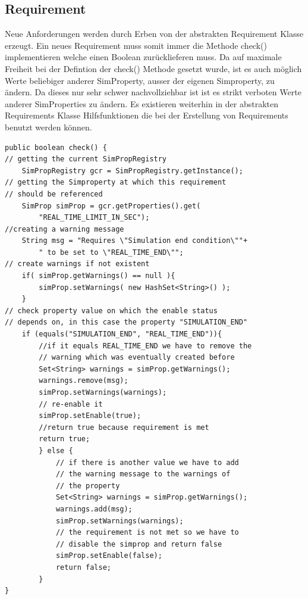 \documentclass[a4paper, 11pt]{article} %
\begin{document}
\subsection{Requirement}
\label{ssub:Requirements}
Neue Anforderungen werden durch Erben von der abstrakten Requirement Klasse erzeugt. Ein neues Requirement muss somit immer die Methode check() implementieren welche einen Boolean zurücklieferen muss. Da auf maximale Freiheit bei der Defintion der check() Methode gesetzt wurde, ist es auch möglich Werte beliebiger anderer SimProperty, ausser der eigenen Simproperty, zu ändern. Da dieses nur sehr schwer nachvollziehbar ist ist es strikt verboten Werte anderer SimProperties zu ändern.
Es existieren weiterhin in der abstrakten Requirements Klasse Hilfsfunktionen die bei der Erstellung von Requirements benutzt werden können.


\begin{lstlisting}[caption={Beispiel: check() Methode einer Enable Anforderung}]
public boolean check() {
// getting the current SimPropRegistry
	SimPropRegistry gcr = SimPropRegistry.getInstance();
// getting the Simproperty at which this requirement 
// should be referenced
	SimProp simProp = gcr.getProperties().get(
		"REAL_TIME_LIMIT_IN_SEC");
//creating a warning message
	String msg = "Requires \"Simulation end condition\""+
	 	" to be set to \"REAL_TIME_END\"";
// create warnings if not existent
	if( simProp.getWarnings() == null ){
		simProp.setWarnings( new HashSet<String>() );
	}
// check property value on which the enable status 
// depends on, in this case the property "SIMULATION_END"
	if (equals("SIMULATION_END", "REAL_TIME_END")){
		//if it equals REAL_TIME_END we have to remove the 
		// warning which was eventually created before
		Set<String> warnings = simProp.getWarnings();
		warnings.remove(msg);
		simProp.setWarnings(warnings);
		// re-enable it
		simProp.setEnable(true);
		//return true because requirement is met
		return true;
		} else {
			// if there is another value we have to add 
			// the warning message to the warnings of 
			// the property
			Set<String> warnings = simProp.getWarnings();
			warnings.add(msg);
			simProp.setWarnings(warnings);
			// the requirement is not met so we have to 
			// disable the simprop and return false
			simProp.setEnable(false);
			return false;
		}
}
\end{lstlisting}
\end{document}
